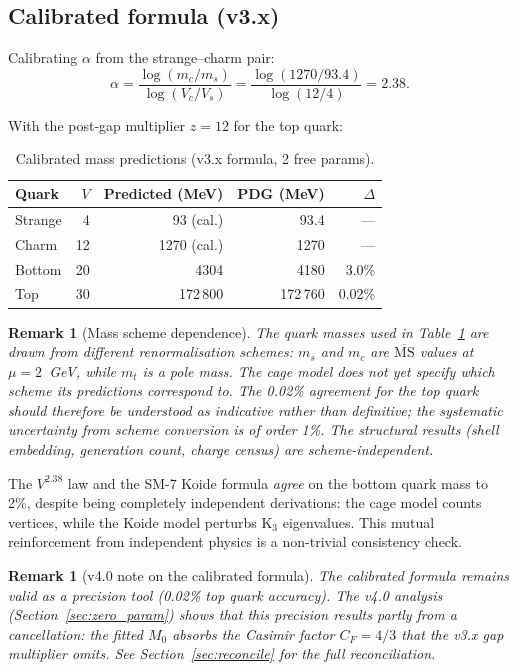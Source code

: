 \documentclass[11pt,letterpaper]{article}
\newtheorem{remark}[theorem]{Remark}
\begin{document}
\subsection{Calibrated formula (v3.x)}

Calibrating $\alpha$ from the strange--charm pair:
\begin{equation}
\alpha = \frac{\log(m_c/m_s)}{\log(V_c/V_s)}
       = \frac{\log(1270/93.4)}{\log(12/4)} = 2.38.
\label{eq:alpha}
\end{equation}

With the post-gap multiplier $z = 12$ for the top quark:

\begin{table}[H]
\centering
\caption{Calibrated mass predictions (v3.x formula, 2 free params).}
\label{tab:mass_v3}
\begin{tabular}{@{}lrrrr@{}}
\toprule
Quark & $V$ & Predicted (MeV) & PDG (MeV) & $\Delta$ \\
\midrule
Strange & 4  & 93 (cal.)   & 93.4   & --- \\
Charm   & 12 & 1270 (cal.) & 1270   & --- \\
Bottom  & 20 & 4304        & 4180   & 3.0\% \\
Top     & 30 & 172\,800    & 172\,760 & 0.02\% \\
\bottomrule
\end{tabular}
\end{table}

\begin{remark}[Mass scheme dependence]
The quark masses used in Table~\ref{tab:mass_v3} are drawn from
different renormalisation schemes: $m_s$ and $m_c$ are
$\overline{\mathrm{MS}}$ values at $\mu = 2$~GeV, while $m_t$ is
a pole mass.  The cage model does not yet specify which scheme its
predictions correspond to.  The 0.02\% agreement for the top quark
should therefore be understood as indicative rather than definitive;
the systematic uncertainty from scheme conversion is of order 1\%.
The structural results (shell embedding, generation count, charge
census) are scheme-independent.
\end{remark}

The $V^{2.38}$ law and the SM-7 Koide formula \emph{agree} on the
bottom quark mass to 2\%, despite being completely independent
derivations: the cage model counts vertices, while the Koide model
perturbs K$_3$ eigenvalues.  This mutual reinforcement from
independent physics is a non-trivial consistency check.

\begin{remark}[v4.0 note on the calibrated formula]
The calibrated formula remains valid as a precision tool (0.02\%
top quark accuracy).  The v4.0 analysis (Section~\ref{sec:zero_param})
shows that this precision results partly from a cancellation: the
fitted $M_0$ absorbs the Casimir factor $C_F = 4/3$ that the v3.x
gap multiplier omits.  See Section~\ref{sec:reconcile} for the full
reconciliation.
\end{remark}
\end{document}
